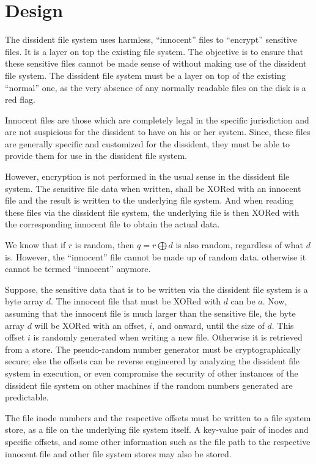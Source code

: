 \documentclass[10pt,onecolumn]{article}
\begin{document}
\section{Design}

The dissident file system uses harmless, ``innocent'' files to ``encrypt'' sensitive files. It is a layer on top the existing file system. The objective is to ensure that these sensitive files cannot be made sense of without making use of the dissident file system. The dissident file system must be a layer on top of the existing ``normal'' one, as the very absence of any normally readable files on the disk is a red flag.  

Innocent files are those which are completely legal in the specific jurisdiction and are not suspicious for the dissident to have on his or her system. Since, these files are generally specific and customized for the dissident, they must be able to provide them for use in the dissident file system. 

However, encryption is not performed in the usual sense in the dissident file system. The sensitive file data when written, shall be XORed with an innocent file and the result is written to the underlying file system. And when reading these files via the dissident file system, the underlying file is then XORed with the corresponding innocent file to obtain the actual data. 

We know that if $\mathit{r}$ is random, then $\mathit{q = r \bigoplus d}$ is also random, regardless of what $\mathit{d}$ is. However, the ``innocent'' file cannot be made up of random data. otherwise it cannot be termed “innocent” anymore. 

Suppose, the sensitive data that is to be written via the dissident file system is a byte array $d$. The innocent file that must be XORed with $d$ can be $a$. Now, assuming that the innocent file is much larger than the sensitive file, the byte array $d$ will be XORed with an offset, $i$, and onward, until the size of $d$. This offset $i$ is randomly generated when writing a new file. Otherwise it is retrieved from a store. The pseudo-random number generator must be cryptographically secure; else the offsets can be reverse engineered by analyzing the dissident file system in execution, or even compromise the security of other instances of the dissident file system on other machines if the random numbers generated are predictable. 

The file inode numbers and the respective offsets must be written to a file system store, as a file on the underlying file system itself. A key-value pair of inodes and specific offsets, and some other information such as the file path to the respective innocent file and other file system stores may also be stored. 
\end{document}
